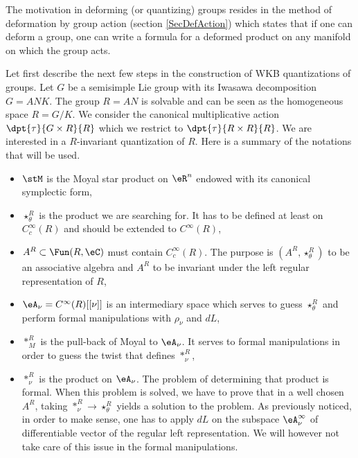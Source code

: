 The motivation in deforming (or quantizing) groups resides in the method of deformation by group action (section \ref{SecDefAction}) which states that if one can deform a group, one can write a formula for a deformed product on any manifold on which the group acts.

Let first describe the next few steps in the construction of WKB quantizations of groups. Let $G$ be a semisimple Lie group with its Iwasawa decomposition $G=ANK$. The group $R=AN$ is solvable and can be seen as the homogeneous space $R=G/K$. We consider the canonical multiplicative action $\dpt{\tau}{G\times R}{R}$ which we restrict to $\dpt{\tau}{R\times R}{R}$. We are interested in a $R$-invariant quantization of $R$. Here is a summary of the notations that will be used.

\begin{itemize}
\item $\stM$ is the Moyal star product on $\eR^n$ endowed with its canonical symplectic form,
\item $\star^R_{\theta}$ is the product we are searching for. It has to be defined at least on $ C_c^{\infty}(R)$ and should be extended to $ C^{\infty}(R)$,
\item $A^R\subset\Fun(R,\eC)$ must contain $ C^{\infty}_c(R)$. The purpose is $(A^R,\star^R_{\theta})$ to be an associative algebra and $A^R$ to be invariant under the left regular representation of $R$,
\item $\eA_{\nu}= C^{\infty}(R)[ [\nu]]$ is an intermediary space which serves to guess $\star^R_{\theta}$ and perform formal manipulations with $\rho_{\nu}$ and $dL$,
\item $\ast_M^R$ is the pull-back of Moyal to $\eA_{\nu}$. It serves to formal manipulations in order to guess the twist that defines $\ast^R_{\nu}$,
\item $\ast^R_{\nu}$ is the product on $\eA_{\nu}$. The problem of determining that product is formal. When this problem is solved, we have to prove that in a well chosen $A^R$, taking $\ast_{\nu}^R\to\star^R_{\theta}$ yields a solution to the problem. As previously noticed, in order to make sense, one has to apply $dL$ on the subspace $\eA_{\nu}^{\infty}$ of differentiable vector of the regular left representation. We will however not take care of this issue in the formal manipulations.
\end{itemize}


